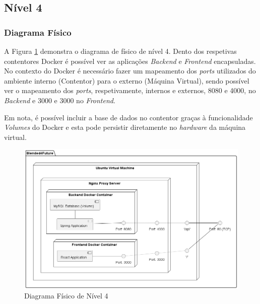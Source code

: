 \subsection{Nível 4}

\subsubsection{Diagrama Físico} 

A Figura \ref{fig:diagram-lvl4-physical} demonstra o diagrama de físico de nível 4. Dento dos respetivas contentores \gls{Docker} é possível ver as aplicações  \textit{Backend} e \textit{Frontend} encapsuladas. No contexto do \gls{Docker} é necessário fazer um mapeamento dos \textit{ports} utilizados do ambiente interno (Contentor) para o externo (Máquina Virtual), sendo possível ver o mapeamento dos \textit{ports}, respetivamente, internos e externos, 8080 e 4000, no \textit{Backend} e 3000 e 3000 no \textit{Frontend}.

Em nota, é possível incluir a base de dados no contentor graças à funcionalidade \textit{Volumes} do Docker e esta pode persistir diretamente no \textit{hardware} da máquina virtual.

\begin{figure}[h!tbp]
    \centering
    \includegraphics[width=\linewidth]{capitulos/cap3-analisedoproblema/assets/arquiteturasistema/physical/physical_l4.png}
    \caption{Diagrama Físico de Nível 4}
    \label{fig:diagram-lvl4-physical}
\end{figure}
